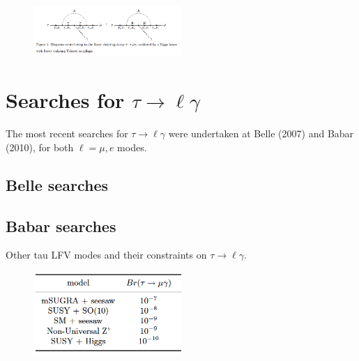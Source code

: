 \documentclass[12pt,a4paper]{article} %
\newcommand{\tlg}{\tau\to\ell\gamma}
\begin{document}
\begin{figure}[h]
\centering
\includegraphics[width=0.5\textwidth]{images/higgs-lfv-modes.png}
\caption{}
\label{}
\end{figure}


\section{Searches for $\tlg$}

The most recent searches for $\tlg$ were undertaken at Belle (2007) and Babar (2010), for both $\ell=\mu,e$ modes.

\subsection{Belle searches}

\subsection{Babar searches}



Other tau LFV modes and their constraints on $\tlg$.


\begin{figure}[h]
\centering
\includegraphics[width=0.5\textwidth]{images/np-models-bounds.png}
\caption{}
\label{}
\end{figure}




\pagebreak



\end{document}
